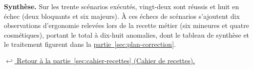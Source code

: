 \vspace{0.8em}
\noindent\textbf{Synthèse.} Sur les trente scénarios exécutés, vingt-deux sont réussis et huit en échec (deux bloquants et six majeurs). À ces échecs de scénarios s'ajoutent dix observations d'ergonomie relevées lors de la recette métier (six mineures et quatre cosmétiques), portant le total à dix-huit anomalies, dont le tableau de synthèse et le traitement figurent dans la \hyperref[sec:plan-correction]{partie~\ref*{sec:plan-correction}}.

\vspace{0.8em}
\noindent\hyperref[sec:cahier-recettes]{$\hookleftarrow$ Retour à la partie~\ref*{sec:cahier-recettes} (Cahier de recettes).}
